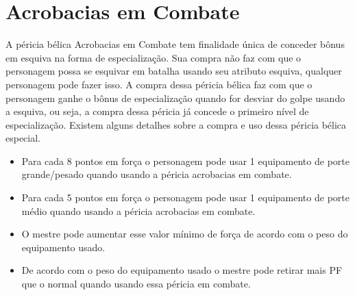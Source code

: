 


\section{Acrobacias em Combate}

A péricia bélica Acrobacias em Combate tem finalidade única de conceder bônus em esquiva na forma de especialização. Sua compra não faz com que o personagem possa se esquivar em batalha usando seu atributo esquiva, qualquer personagem pode fazer isso. A compra dessa péricia bélica faz com que o personagem ganhe o bônus de especialização quando for desviar do golpe usando a esquiva, ou seja, a compra dessa péricia já concede o primeiro nível de especialização. Existem alguns detalhes sobre a compra e uso dessa péricia bélica especial.

\begin{itemize}
	\item Para cada 8 pontos em força o personagem pode usar 1 equipamento de porte grande/pesado quando usando a péricia acrobacias em combate.
	\item Para cada 5 pontos em força o personagem pode usar 1 equipamento de porte médio quando usando a péricia acrobacias em combate.
	\item O mestre pode aumentar esse valor mínimo de força de acordo com o peso do equipamento usado.
	\item De acordo com o peso do equipamento usado o mestre pode retirar mais PF que o normal quando usando essa péricia em combate.					
\end{itemize}
	


